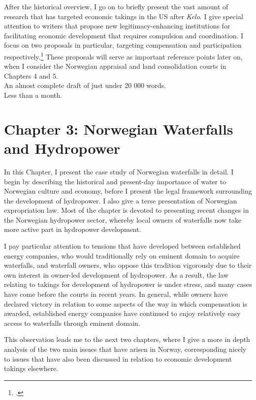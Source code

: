 \documentclass[12pt,a4paper]{article} %
\begin{document}
After the historical overview, I go on to briefly present the vast amount of research that has targeted economic takings in the US after {\it Kelo}. I give special attention to writers that propose new legitimacy-enhancing institutions for facilitating  economic development that requires compulsion and coordination. I focus on two proposals in particular, targeting compensation and participation respectively.\footcite{lehavi07,heller08} These proposals will serve as important reference points later on, when I consider the Norwegian appraisal  and land consolidation courts in Chapters 4 and 5. \\

 An almost complete draft of just under 20 000 words. \\

 Less than a month.

\section*{Chapter 3: Norwegian Waterfalls and Hydropower}\label{chap:3}

In this Chapter, I present the case study of Norwegian waterfalls in detail. I begin by describing the historical and present-day importance of water to Norwegian culture and economy, before I present the legal framework surrounding the development of hydropower. I also give a terse presentation of Norwegian expropriation law. Most of the chapter is devoted to presenting recent changes in the Norwegian hydropower sector, whereby local owners of waterfalls now take more active part in hydropower development.

I pay particular attention to tensions that have developed between established energy companies, who would traditionally rely on eminent domain to acquire waterfalls, and waterfall owners, who oppose this tradition vigorously due to their own interest in owner-led development of hydropower. As a result, the law relating to takings for development of hydropower is under stress, and many cases have come before the courts in recent years. In general, while owners have declared victory in relation to some aspects of the way in which compensation is awarded, established energy companies have continued to enjoy relatively easy access to waterfalls through eminent domain.

This observation leads me to the next two chapters, where I give a more in depth analysis of the two main issues that have arisen in Norway, corresponding nicely to issues that have also been discussed in relation to economic development takings elsewhere. \\
\end{document}
